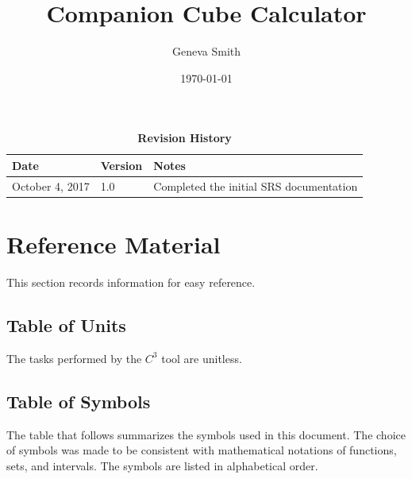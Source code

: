\documentclass[12pt]{article}
\newcommand{\prognameAbbrv}{$C^{3}$}
\begin{document}
\title{Companion Cube Calculator} 
\author{Geneva Smith}
\date{\today}
	
\maketitle

\tableofcontents

\begin{table}[bp]
\caption{\bf Revision History}
\begin{tabularx}{\textwidth}{p{3cm}p{2cm}X}
\toprule {\bf Date} & {\bf Version} & {\bf Notes}\\
\midrule
October 4, 2017 & 1.0 & Completed the initial SRS documentation\\
\bottomrule
\end{tabularx}
\end{table}

\newpage
\section{Reference Material}

This section records information for easy reference.

\subsection{Table of Units}

The tasks performed by the \prognameAbbrv{} tool are unitless.

\subsection{Table of Symbols}

The table that follows summarizes the symbols used in this document. The choice 
of symbols was made to be consistent with mathematical notations of functions, 
sets, and intervals. The symbols are listed in alphabetical order.
\end{document}
